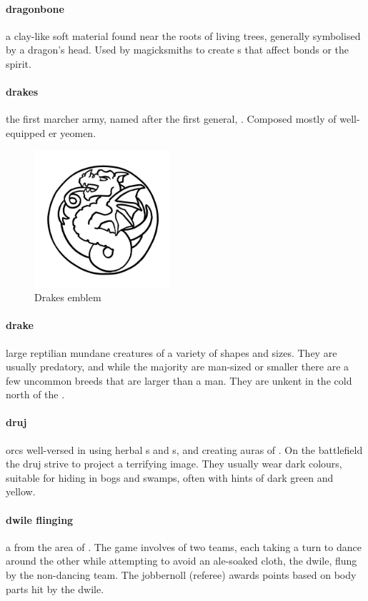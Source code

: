 \paragraph{dragonbone} a clay-like soft material found near the roots of living trees, generally symbolised by a dragon's head. Used by magicksmiths to create s that affect bonds or the spirit.
\paragraph{drakes} the first marcher army, named after the first general, . Composed mostly of well-equipped er yeomen.\begin{figure}\centering\includegraphics[width=5cm]{encyclopedia/Drakes}\caption{Drakes emblem}\end{figure}
\paragraph{drake} large reptilian mundane creatures of a variety of shapes and sizes. They are usually predatory, and while the majority are man-sized or smaller there are a few uncommon breeds that are larger than a man. They are unkent in the cold north of the .
\paragraph{druj}  orcs well-versed in using herbal s and s, and creating auras of . On the battlefield the druj strive to project a terrifying image. They usually wear dark colours, suitable for hiding in bogs and swamps, often with hints of dark green and yellow.
\paragraph{dwile flinging} a  from the area of . The game involves of two teams, each taking a turn to dance around the other while attempting to avoid an ale-soaked cloth, the dwile, flung by the non-dancing team. The jobbernoll (referee) awards points based on body parts hit by the dwile.
